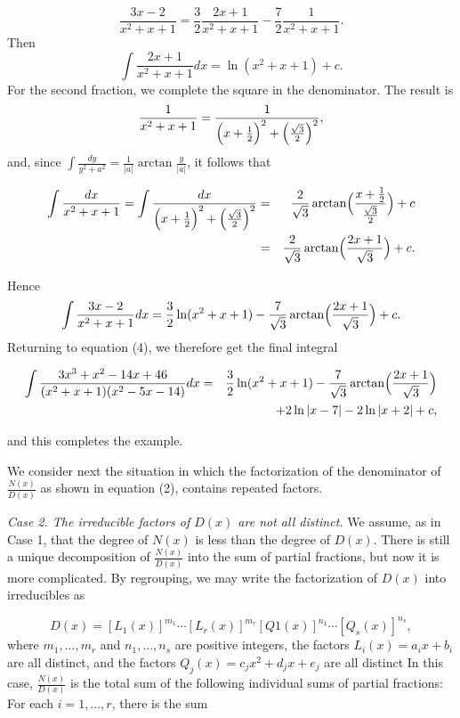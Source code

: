 \begin{example}
$$
\frac{3x - 2}{x^2 + x + 1} = \frac{3}{2} \frac{2x + 1}{x^2 + x + 1} 
- \frac{7}{2} \frac{1}{x^2 + x + 1}.
$$
\noindent Then
$$
\int \frac{2x + 1}{x^2 + x + 1} dx = \ln (x^2 + x + 1) + c.
$$
\noindent For the second fraction, we complete the square in the denominator. The result is
$$
\frac{1}{x^2 + x + 1} = \frac{1}{\Bigl(x + \frac{1}{2}\Bigr)^2 + \Bigl(\frac{\sqrt 3}{2}\Bigr)^2}, 
$$
\noindent and, since $\int \frac{dy}{y^2 + a^2} = \frac{1}{|a|} \arctan \frac{y}{|a|}$, it follows that 

\begin{eqnarray*}
\int \frac{dx}{x^2 + x + 1} = \int \frac{dx}{\Bigl(x + \frac{1}{2}\Bigr)^2 + \Bigl(\frac{\sqrt 3}{2}\Bigr)^2} 
&=& \frac{2}{\sqrt 3} \arctan \Bigl(\frac{x + \frac{1}{2}}{\frac{\sqrt 3}{2}} \Bigr) + c\\
&=& \frac{2}{\sqrt 3} \arctan \Bigl(\frac{2x + 1}{\sqrt 3} \Bigr) + c.
\end{eqnarray*}

\noindent Hence
$$
\int \frac{3x - 2}{x^2 + x + 1} dx = \frac{3}{2} \ln(x^2 + x + 1) - \frac{7}{\sqrt 3} \arctan \Bigl(\frac{2x + 1}{\sqrt 3} \Bigr) + c.
$$
\noindent Returning to equation (4), we therefore get the final integral 

\begin{eqnarray*}
\int \frac{3x^3 + x^2 -14x + 46}{(x^2 + x + 1)(x^2 - 5x - 14)} dx 
&=& \frac{3}{2} \ln(x^2 + x + 1) - \frac{7}{\sqrt 3} \arctan \Bigl(\frac{2x+ 1}{\sqrt 3} \Bigr)\\
&& + 2 \ln |x - 7| - 2 \ln |x + 2| + c, 
\end{eqnarray*}

\noindent and this completes the example.
\end{example}

We consider next the situation in which the factorization of the denominator of $\frac{N(x)}{D(x)}$ as shown in equation (2), contains repeated factors.
\medskip

\textit{Case 2. The irreducible factors of $D(x)$ are not all distinct.} 
We assume, as in Case 1, that the degree of $N(x)$ is less than the degree of $D(x)$. There is still a unique decomposition of $\frac{N(x)}{D(x)}$ into the sum of partial fractions, but now it is more complicated. By regrouping, we may write the factorization of $D(x)$ into irreducibles as

\begin{equation}
D(x) = [L_{1}(x)]^{m_1} \cdots  [L_{r}(x)]^{m_r} [Q1(x)]^{n_1} \cdots [Q_{s}(x)]^{n_s}, 
\label{eq7.4.5}
\end{equation}
\noindent where $m_1, ... , m_r$ and $n_1, ... , n_s$ are positive integers, 
the factors $L_{i}(x) = a_{i}x + b_{i}$ are all distinct, and the factors 
$Q_{j}(x) = c_{j}x^2 + d_{j}x + e_{j}$ are all distinct In this case, $\frac{N(x)}{D(x)}$ is the total sum of the following individual sums 
of partial fractions: For each $i = 1, . . ., r$, there is the sum

